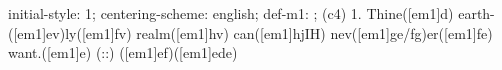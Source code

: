 initial-style: 1;
centering-scheme: english;
def-m1: \grealign;
(c4) 1. Thine([em1]d) earth-([em1]ev)ly([em1]fv) realm([em1]hv) can([em1]hjIH) nev([em1]ge/fg)er([em1]fe) want.([em1]e) (::) ([em1]ef)([em1]ede)